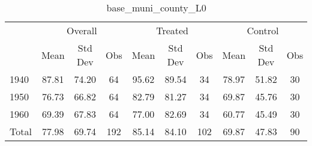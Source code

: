 \begin{table}[htbp]\centering
\def\sym#1{\ifmmode^{#1}\else\(^{#1}\)\fi}
\caption{base\_muni\_county\_L0 \label{tab1}}
\begin{tabular}{l*{3}{ccc}}
\toprule
                    &\multicolumn{3}{c}{Overall}           &\multicolumn{3}{c}{Treated}           &\multicolumn{3}{c}{Control}           \\
                    &        Mean&     Std Dev&         Obs&        Mean&     Std Dev&         Obs&        Mean&     Std Dev&         Obs\\
\midrule
1940                &       87.81&       74.20&          64&       95.62&       89.54&          34&       78.97&       51.82&          30\\
1950                &       76.73&       66.82&          64&       82.79&       81.27&          34&       69.87&       45.76&          30\\
1960                &       69.39&       67.83&          64&       77.00&       82.69&          34&       60.77&       45.49&          30\\
Total               &       77.98&       69.74&         192&       85.14&       84.10&         102&       69.87&       47.83&          90\\
\bottomrule
\end{tabular}
\end{table}
